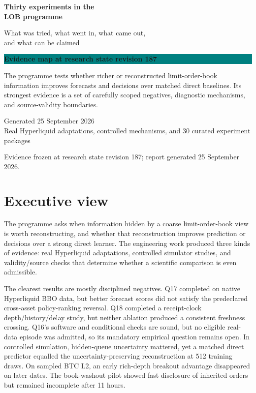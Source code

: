 \documentclass[10pt,a4paper]{article}
\begin{document}
\begin{titlepage}
\pagecolor{navy}\color{white}
\vspace*{20mm}
{\sffamily\bfseries\fontsize{31}{35}\selectfont Thirty experiments in the\\LOB programme\par}
\vspace{7mm}
{\sffamily\fontsize{15}{19}\selectfont What was tried, what went in, what came out,\\and what can be claimed\par}
\vspace{18mm}
\colorbox{teal}{\parbox{0.87\textwidth}{\color{white}\sffamily\bfseries\large Evidence map at research state revision 187}}\par
\vspace{14mm}
{\large\raggedright
The programme tests whether richer or reconstructed limit-order-book information improves forecasts and decisions over matched direct baselines. Its strongest evidence is a set of carefully scoped negatives, diagnostic mechanisms, and source-validity boundaries.\par}
\vfill
{\sffamily\small Generated 25 September 2026\\Real Hyperliquid adaptations, controlled mechanisms, and 30 curated experiment packages}
\end{titlepage}
\nopagecolor\color{ink}
\tableofcontents
\clearpage
Evidence frozen at research state revision 187; report generated 25 September 2026.\par
\section{Executive view}
The programme asks when information hidden by a coarse limit-order-book view is worth reconstructing, and whether that reconstruction improves prediction or decisions over a strong direct learner. The engineering work produced three kinds of evidence: real Hyperliquid adaptations, controlled simulator studies, and validity/source checks that determine whether a scientific comparison is even admissible.\par
The clearest results are mostly disciplined negatives. Q17 completed on native Hyperliquid BBO data, but better forecast scores did not satisfy the predeclared cross-asset policy-ranking reversal. Q18 completed a receipt-clock depth/history/delay study, but neither ablation produced a consistent freshness crossing. Q16's software and conditional checks are sound, but no eligible real-data episode was admitted, so its mandatory empirical question remains open. In controlled simulation, hidden-queue uncertainty mattered, yet a matched direct predictor equalled the uncertainty-preserving reconstruction at 512 training draws. On sampled BTC L2, an early rich-depth breakout advantage disappeared on later dates. The book-washout pilot showed fast disclosure of inherited orders but remained incomplete after 11 hours.\par
\end{document}

